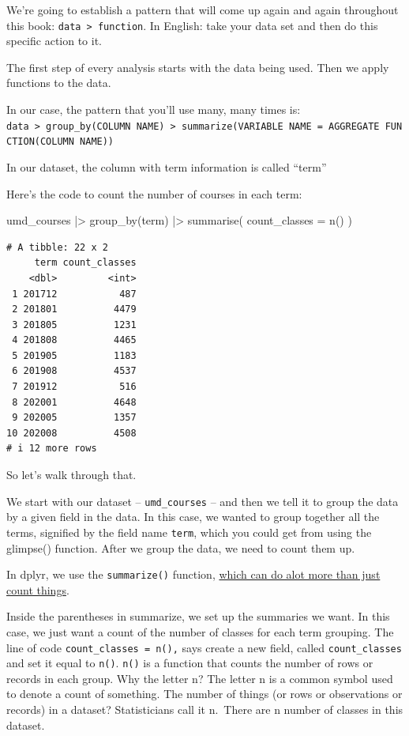 \documentclass[
  letterpaper,
  DIV=11,
  numbers=noendperiod]{scrreprt}
\newenvironment{Shaded}{\begin{snugshade}}{\end{snugshade}}
\newcommand{\AttributeTok}[1]{\textcolor[rgb]{0.40,0.45,0.13}{#1}}
\newcommand{\FunctionTok}[1]{\textcolor[rgb]{0.28,0.35,0.67}{#1}}
\newcommand{\NormalTok}[1]{\textcolor[rgb]{0.00,0.23,0.31}{#1}}
\newcommand{\SpecialCharTok}[1]{\textcolor[rgb]{0.37,0.37,0.37}{#1}}
\begin{document}
We're going to establish a pattern that will come up again and again
throughout this book: \texttt{data\ \textbar{}\textgreater{}\ function}.
In English: take your data set and then do this specific action to it.

The first step of every analysis starts with the data being used. Then
we apply functions to the data.

In our case, the pattern that you'll use many, many times is:
\texttt{data\ \textbar{}\textgreater{}\ group\_by(COLUMN\ NAME)\ \textbar{}\textgreater{}\ summarize(VARIABLE\ NAME\ =\ AGGREGATE\ FUNCTION(COLUMN\ NAME))}

In our dataset, the column with term information is called ``term''

Here's the code to count the number of courses in each term:

\begin{Shaded}
\begin{Highlighting}[]
\NormalTok{umd\_courses }\SpecialCharTok{|\textgreater{}}
  \FunctionTok{group\_by}\NormalTok{(term) }\SpecialCharTok{|\textgreater{}}
  \FunctionTok{summarise}\NormalTok{(}
    \AttributeTok{count\_classes =} \FunctionTok{n}\NormalTok{()}
\NormalTok{  )}
\end{Highlighting}
\end{Shaded}

\begin{verbatim}
# A tibble: 22 x 2
     term count_classes
    <dbl>         <int>
 1 201712           487
 2 201801          4479
 3 201805          1231
 4 201808          4465
 5 201905          1183
 6 201908          4537
 7 201912           516
 8 202001          4648
 9 202005          1357
10 202008          4508
# i 12 more rows
\end{verbatim}

So let's walk through that.

We start with our dataset -- \texttt{umd\_courses} -- and then we tell
it to group the data by a given field in the data. In this case, we
wanted to group together all the terms, signified by the field name
\texttt{term}, which you could get from using the glimpse() function.
After we group the data, we need to count them up.

In dplyr, we use the \texttt{summarize()} function,
\href{http://dplyr.tidyverse.org/reference/summarise.html}{which can do
alot more than just count things}.

Inside the parentheses in summarize, we set up the summaries we want. In
this case, we just want a count of the number of classes for each term
grouping. The line of code \texttt{count\_classes\ =\ n(),} says create
a new field, called \texttt{count\_classes} and set it equal to
\texttt{n()}. \texttt{n()} is a function that counts the number of rows
or records in each group. Why the letter n? The letter n is a common
symbol used to denote a count of something. The number of things (or
rows or observations or records) in a dataset? Statisticians call it
n.~There are n number of classes in this dataset.
\end{document}
